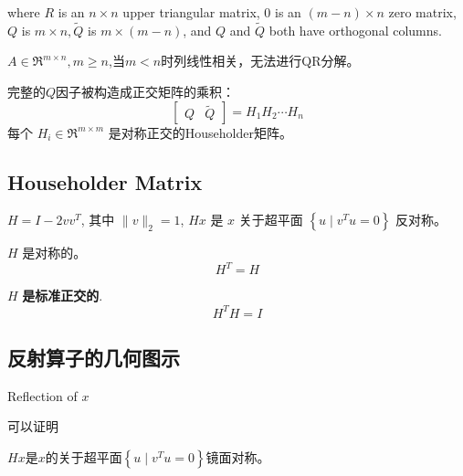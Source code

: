 where $ R $ is an $ n \times n $ upper triangular matrix, $0$ is an $ (m-n) \times n $ zero matrix, $ Q  $ is $ m \times n,\tilde{Q} $ is $ m \times(m-n) $, and $ Q $ and $ \tilde{Q} $ both have orthogonal columns. 

\begin{remark}
    $A \in \mathfrak{R}^{m \times n}, m \ge n$,当$m < n$时列线性相关，无法进行QR分解。
\end{remark}



完整的$Q$因子被构造成正交矩阵的乘积：
\begin{equation}
\left[\begin{array}{ll}
Q & \tilde{Q}
\end{array}\right]=H_{1} H_{2} \cdots H_{n}
\end{equation}
每个 $ H_{i} \in \mathfrak{R}^{m \times m} $ 是对称正交的Householder矩阵。



\subsection{Householder Matrix}

\begin{theorem}
    $ H=I-2 v v^{T} $, 其中 $ \|v\|_{2}=1 $, $ H x $ 是 $ x $ 关于超平面 $ \left\{u \mid v^{T} u=0\right\} $ 反对称。
\end{theorem}

\begin{theorem}
    $ H $ 是对称的。
    \begin{equation} H^{T}=H \end{equation}
\end{theorem}
    
\begin{theorem}
    $ H $ \textbf{是标准正交的}.
\begin{equation} H^{T} H=I \end{equation}
\end{theorem}

\subsection{反射算子的几何图示}
\begin{FigureCenter}{Reflection of $x$}
    
\end{FigureCenter}

可以证明

\begin{theorem}
    $Hx$是$x$的关于超平面$ \left\{u \mid v^{T} u=0\right\} $镜面对称。
\end{theorem}



